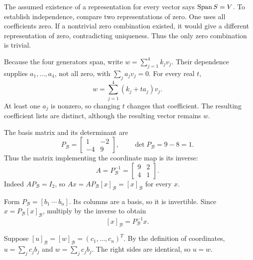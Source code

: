 The assumed existence of a representation for every vector says
$\operatorname{Span} S=V$. To establish independence, compare two representations
of zero. One uses all coefficients zero. If a nontrivial zero
combination existed, it would give a different representation of zero,
contradicting uniqueness. Thus the only zero combination is trivial.

Because the four generators span, write $w=\sum_{j=1}^4k_jv_j$.
Their dependence supplies $a_1,\ldots,a_4$, not all zero, with
$\sum_ja_jv_j=0$. For every real $t$,
\[
w=\sum_{j=1}^4(k_j+ta_j)v_j.
\]
At least one $a_j$ is nonzero, so changing $t$ changes that coefficient.
The resulting coefficient lists are distinct, although the resulting
vector remains $w$.

The basis matrix and its determinant are
\[
P_{\mathcal B}=\begin{bmatrix}1&-2\\-4&9\end{bmatrix},
\qquad\det P_{\mathcal B}=9-8=1.
\]
Thus the matrix implementing the coordinate map is its inverse:
\[
A=P_{\mathcal B}^{-1}=\begin{bmatrix}9&2\\4&1\end{bmatrix}.
\]
Indeed $AP_{\mathcal B}=I_2$, so $Ax=AP_{\mathcal B}[x]_{\mathcal B}
=[x]_{\mathcal B}$ for every $x$.

Form $P_{\mathcal B}=[b_1\ \cdots\ b_n]$. Its columns are a basis,
so it is invertible. Since $x=P_{\mathcal B}[x]_{\mathcal B}$,
multiply by the inverse to obtain
\[
[x]_{\mathcal B}=P_{\mathcal B}^{-1}x.
\]

Suppose $[u]_{\mathcal B}=[w]_{\mathcal B}=(c_1,\ldots,c_n)^T$.
By the definition of coordinates, $u=\sum_jc_jb_j$ and
$w=\sum_jc_jb_j$. The right sides are identical, so $u=w$.

